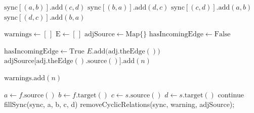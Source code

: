 \documentclass[a4paper]{article}
\begin{document}
\begin{algorithm}
    \begin{algorithmic}[1]
                \State $\mathrm{sync}[(a,b)].\mathrm{add}(c,d)$
                \State $\mathrm{sync}[(b,a)].\mathrm{add}(d,c)$
                \State $\mathrm{sync}[(c,d)].\mathrm{add}(a,b)$
                \State $\mathrm{sync}[(d,c)].\mathrm{add}(b,a)$
        \EndFunction
    \end{algorithmic}
\end{algorithm}
\begin{algorithm}
    \begin{algorithmic}[1]


            \State $\mathrm{warnings} \gets [\,]$
            \State $\mathrm{E} \gets [\,]$
            \State $\mathrm{adjSource} \gets \mathrm{Map}\{\}$
                \State $\mathrm{hasIncomingEdge} \gets \mathrm{False}$

                        \State $\mathrm{hasIncomingEdge} \gets \mathrm{True}$
                        \State $E.\mathrm{add}\bigl(\mathrm{adj}.\mathrm{theEdge}()\bigr)$
                        \State $\mathrm{adjSource}\bigl[\mathrm{adj}.\mathrm{theEdge}().\mathrm{source}()\bigr].\mathrm{add}(n)$
                    \EndIf
                \EndFor

                    \State $\mathrm{warnings}.\mathrm{add}(n)$
                \EndIf
            \EndFor

                \State $a \gets f.\mathrm{source}()$
                \State $b \gets f.\mathrm{target}()$
                \State $c \gets s.\mathrm{source}()$
                \State $d \gets s.\mathrm{target}()$
                    \State continue
                \EndIf
                \State fillSync(sync, a, b, c, d)
            \EndFor
            \State removeCyclicRelations(sync, warning, adjSource);  

            \State {}
        \EndFunction
   \end{algorithmic} 
\end{algorithm}
\end{document}
